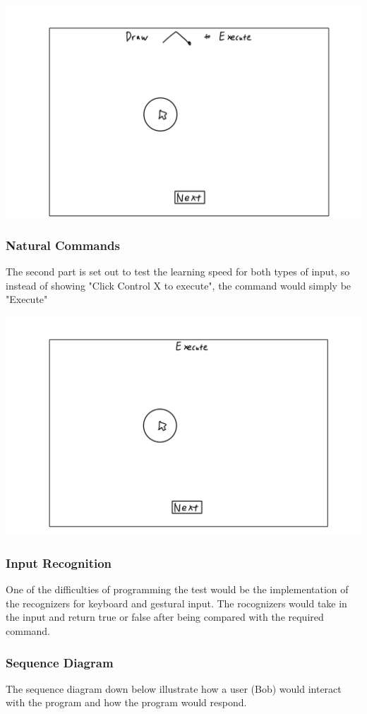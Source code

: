 \documentclass[12pt]{article}
\begin{document}
\includegraphics[scale=0.15]{draw.jpg}

\subsubsection{Natural Commands}
The second part is set out to test the learning speed for both types of input, so instead of showing "Click Control X to execute", the command would simply be "Execute"

\includegraphics[scale=0.15]{x.jpg}

\subsubsection{Input Recognition}
One of the difficulties of programming the test would be the implementation of the recognizers for keyboard and gestural input. The rocognizers would take in the input and return true or false after being compared with the required command.

\subsubsection{Sequence Diagram}
The sequence diagram down below illustrate how a user (Bob) would interact with the program and how the program would respond.
\end{document}

